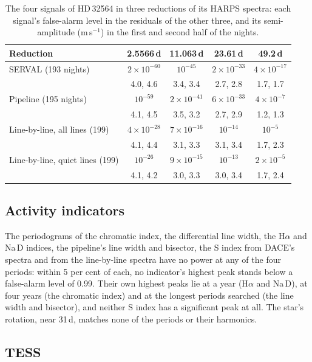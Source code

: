 \documentclass[3p,11pt]{elsarticle}
\newcommand{\ms}{m\,s$^{-1}$}
\begin{document}
\begin{table}[!htbp]
\centering
\caption{The four signals of HD\,32564 in three reductions of its HARPS spectra: each signal's
false-alarm level in the residuals of the other three, and its semi-amplitude (\ms) in the first and
second half of the nights.}\label{tab:reductions}
\small
\begin{tabular}{l c c c c}
\toprule
Reduction & 2.5566\,d & 11.063\,d & 23.61\,d & 49.2\,d \\
\midrule
SERVAL (193 nights) & $2\times10^{-60}$ & $10^{-45}$ & $2\times10^{-33}$ & $4\times10^{-17}$ \\
& 4.0, 4.6 & 3.4, 3.4 & 2.7, 2.8 & 1.7, 1.7 \\
Pipeline (195 nights) & $10^{-59}$ & $2\times10^{-41}$ & $6\times10^{-33}$ & $4\times10^{-7}$ \\
& 4.1, 4.5 & 3.5, 3.2 & 2.7, 2.9 & 1.2, 1.3 \\
Line-by-line, all lines (199) & $4\times10^{-28}$ & $7\times10^{-16}$ & $10^{-14}$ & $10^{-5}$ \\
& 4.1, 4.4 & 3.1, 3.3 & 3.1, 3.4 & 1.7, 2.3 \\
Line-by-line, quiet lines (199) & $10^{-26}$ & $9\times10^{-15}$ & $10^{-13}$ & $2\times10^{-5}$ \\
& 4.1, 4.2 & 3.0, 3.3 & 3.0, 3.4 & 1.7, 2.4 \\
\bottomrule
\end{tabular}
\end{table}

\subsection{Activity indicators}

The periodograms of the chromatic index, the differential line width, the H$\alpha$ and Na\,D indices,
the pipeline's line width and bisector, the S index from DACE's spectra and from the line-by-line spectra
have no power at any of the four periods: within 5 per cent of each, no indicator's highest peak stands
below a false-alarm level of 0.99. Their own highest peaks lie at a year (H$\alpha$ and Na\,D), at four
years (the chromatic index) and at the longest periods searched (the line width and bisector), and
neither S index has a significant peak at all. The star's rotation, near 31\,d, matches none of the
periods or their harmonics.

\subsection{TESS}
\end{document}
